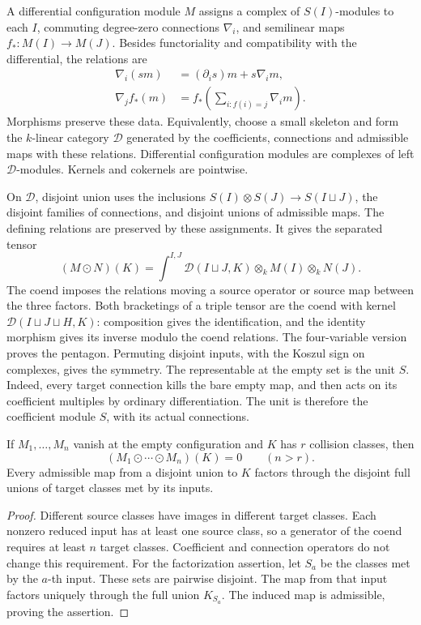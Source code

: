 A differential configuration module \(M\) assigns a complex of
\(S(I)\)-modules to each \(I\), commuting degree-zero connections
\(\nabla_i\), and semilinear maps \(f_*:M(I)\to M(J)\).
Besides functoriality and compatibility with the differential, the
relations are
\begin{align*}
 \nabla_i(sm)&=(\partial_i s)m+s\nabla_i m,\\
 \nabla_j f_*(m)&=f_*\left(\sum_{i:f(i)=j}\nabla_i m\right).
\end{align*}
Morphisms preserve these data.  Equivalently, choose a small skeleton
and form the \(k\)-linear category \(\mathscr D\) generated by the
coefficients, connections and admissible maps with these relations.
Differential configuration modules are complexes of left
\(\mathscr D\)-modules.  Kernels and cokernels are pointwise.

On \(\mathscr D\), disjoint union uses the inclusions
\(S(I)\otimes S(J)\to S(I\sqcup J)\), the disjoint families of
connections, and disjoint unions of admissible maps.  The defining
relations are preserved by these assignments.  It gives the separated tensor
\begin{equation}\label{wo:eq:tensor}
 (M\odot N)(K)=
 \int^{I,J}\mathscr D(I\sqcup J,K)
       \otimes_k M(I)\otimes_k N(J).
\end{equation}
The coend imposes the relations moving a source operator or source
map between the three factors.  Both bracketings of a triple tensor
are the coend with kernel
\(\mathscr D(I\sqcup J\sqcup H,K)\): composition gives the
identification, and the identity morphism gives its inverse modulo
the coend relations.  The four-variable version proves the pentagon.
Permuting disjoint inputs, with the Koszul sign on complexes, gives
the symmetry.  The representable at the empty set is the unit \(S\).
Indeed, every target connection kills the bare empty map, and then
acts on its coefficient multiples by ordinary differentiation.
The unit is therefore the coefficient module \(S\), with its actual
connections.

\begin{lemma}\label{wo:lem:support}
If \(M_1,\ldots,M_n\) vanish at the empty configuration and \(K\)
has \(r\) collision classes, then
\[
 (M_1\odot\cdots\odot M_n)(K)=0\qquad(n>r).
\]
Every admissible map from a disjoint union to \(K\) factors through
the disjoint full unions of target classes met by its inputs.
\end{lemma}
\begin{proof}
Different source classes have images in different target classes.
Each nonzero reduced input has at least one source class, so a
generator of the coend requires at least \(n\) target classes.
Coefficient and connection operators do not change this requirement.
For the factorization assertion, let \(S_a\) be the classes met by
the \(a\)-th input.  These sets are pairwise disjoint.  The map
from that input factors uniquely through the full union \(K_{S_a}\).
The induced map is admissible, proving the assertion.
\end{proof}

